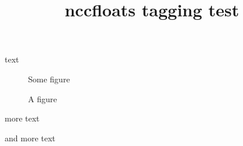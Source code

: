 \documentclass{article}
\title{nccfloats tagging test}
\begin{document}
text

\begin{figure}
Some figure
\caption{A figure}
\end{figure}

more text


and more text

\end{document}
